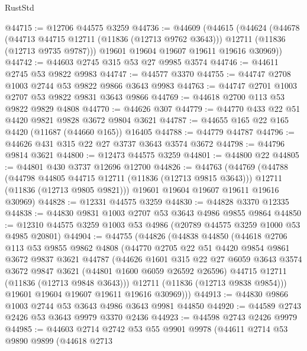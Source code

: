 \begin{lexlean}{RustStd}
\begin{coremodule}
@44715 := @12706 @44575 @3259
@44736 := @44609
    (@44615
      (@44624
        (@44678
          (@44713 @44715 @12711 (@11836 (@12713 @9762 @3643)))
          @12711
          (@11836 (@12713 @9735 @9787)))
        @19601
        @19604
        @19607
        @19611
        @19616
        @30969))
@44742 := @44603 @2745 @315 @53 @27 @9985 @3574
@44746 := @44611 @2745 @53 @9822 @9983
@44747 := @44577 @3370
@44755 := @44747 @2708 @1003 @2744 @53 @9822 @9866 @3643 @9983
@44763 := @44747 @2701 @1003 @2707 @53 @9822 @9831 @3643 @9866
@44769 := @44618 @2700 @113 @53 @9822 @9829 @4808
@44770 := @44626 @307
@44779 := @44770 @433 @22 @51 @4420 @9821 @9828 @3672 @9804 @3621
@44787 := @44655 @165 @22 @165 @4420 (@11687 (@44660 @165)) @16405
@44788 := @44779 @44787
@44796 := @44626 @431 @315 @22 @27 @3737 @3643 @3574 @3672
@44798 := @44796 @9814 @3621
@44800 := @12473 @44575 @3259
@44801 := @44800 @22
@44805 := @44801 @430 @3737 @12696 @12700
@44826 := @44763
    (@44769
      (@44788
        (@44798 @44805 @44715 @12711 (@11836 (@12713 @9815 @3643)))
        @12711
        (@11836 (@12713 @9805 @9821)))
      @19601
      @19604
      @19607
      @19611
      @19616
      @30969)
@44828 := @12331 @44575 @3259
@44830 := @44828 @3370 @12335
@44838 := @44830 @9831 @1003 @2707 @53 @3643 @4986 @9855 @9864
@44850 := @12310 @44575 @3259 @1003 @53 @4986 (@20789 @44575 @3259 @1000 @53 @4985 @20801)
@44904 := @44755
    (@44826
      (@44838
        @44850
        (@44618
          @2706
          @113
          @53
          @9855
          @9862
          @4808
          (@44770
            @2705
            @22
            @51
            @4420
            @9854
            @9861
            @3672
            @9837
            @3621
            @44787
            (@44626
              @1601
              @315
              @22
              @27
              @6059
              @3643
              @3574
              @3672
              @9847
              @3621
              (@44801 @1600 @6059 @26592 @26596)
              @44715
              @12711
              (@11836 (@12713 @9848 @3643)))
            @12711
            (@11836 (@12713 @9838 @9854)))
          @19601
          @19604
          @19607
          @19611
          @19616
          @30969)))
@44913 := @44830 @9866 @1003 @2744 @53 @3643 @4986 @3643 @9981 @44850
@44920 := @44589 @2743 @2426 @53 @3643 @9979 @3370 @2436
@44923 := @44598 @2743 @2426 @9979
@44985 := @44603
    @2714
    @2742
    @53
    @55
    @9901
    @9978
    (@44611
      @2714
      @53
      @9890
      @9899
      (@44618
        @2713

\end{coremodule}
\end{lexlean}

